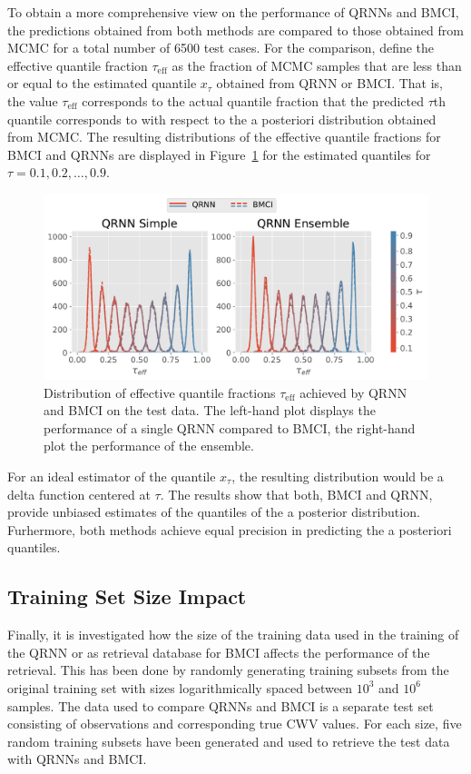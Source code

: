 \documentclass[journal abbreviation, manuscript]{copernicus}
\begin{document}
  To obtain a more comprehensive view on the performance of QRNNs and BMCI, the
  predictions obtained from both methods are compared to those obtained from
  MCMC for a total number of 6500 test cases. For the comparison, define the
  effective quantile fraction $\tau_{\text{eff}}$ as the fraction of MCMC
  samples that are less than or equal to the estimated quantile $x_\tau$
  obtained from QRNN or BMCI. That is, the value $\tau_\text{eff}$ corresponds
  to the actual quantile fraction that the predicted $\tau$th quantile
  corresponds to with respect to the a posteriori distribution obtained from
  MCMC. The resulting distributions of the effective quantile fractions for BMCI
  and QRNNs are displayed in Figure~\ref{fig:quantile_fractions} for the
  estimated quantiles for $\tau = 0.1, 0.2, \ldots, 0.9$.

  \begin{figure}[hbpt!]
    \centering
    \includegraphics[width = 0.8\linewidth]{../plots/quantile_fractions}
    \caption{Distribution of effective quantile fractions $\tau_\text{eff}$ achieved by
      QRNN and BMCI on the test data. The left-hand plot displays the performance of a
      single QRNN compared to BMCI, the right-hand plot the performance of the ensemble.}
    \label{fig:quantile_fractions}
  \end{figure}

  For an ideal estimator of the quantile $x_\tau$, the resulting distribution
  would be a delta function centered at $\tau$. The results show that both, BMCI
  and QRNN, provide unbiased estimates of the quantiles of the a posterior
  distribution. Furhermore, both methods achieve equal precision in predicting
  the a posteriori quantiles.

\subsection{Training Set Size Impact}

Finally, it is investigated how the size of the training data used in the
training of the QRNN or as retrieval database for BMCI affects the performance
of the retrieval. This has been done by randomly generating training subsets
from the original training set with sizes logarithmically spaced between $10^3$
and $10^6$ samples. The data used to compare QRNNs and BMCI is a separate test
set consisting of observations and corresponding true CWV values. For each size,
five random training subsets have been generated and used to retrieve the test
data with QRNNs and BMCI.
\end{document}

